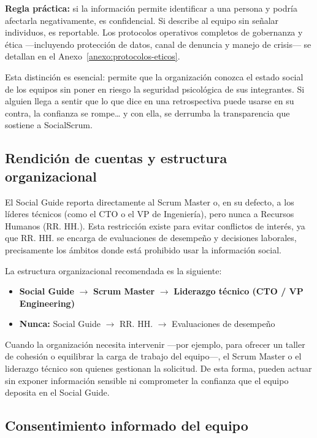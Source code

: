 \noindent\textbf{Regla práctica:} si la información permite identificar a una persona y podría afectarla negativamente, es confidencial. Si describe al equipo sin señalar individuos, es reportable. Los protocolos operativos completos de gobernanza y ética ---incluyendo protección de datos, canal de denuncia y manejo de crisis--- se detallan en el Anexo~\ref{anexo:protocolos-eticos}.

Esta distinción es esencial: permite que la organización conozca el estado social de los equipos sin poner en riesgo la seguridad psicológica de sus integrantes. Si alguien llega a sentir que lo que dice en una retrospectiva puede usarse en su contra, la confianza se rompe… y con ella, se derrumba la transparencia que sostiene a SocialScrum.

\subsection{Rendición de cuentas y estructura organizacional}

El Social Guide reporta directamente al Scrum Master o, en su defecto, a los líderes técnicos (como el CTO o el VP de Ingeniería), pero nunca a Recursos Humanos (RR. HH.). Esta restricción existe para evitar conflictos de interés, ya que RR. HH. se encarga de evaluaciones de desempeño y decisiones laborales, precisamente los ámbitos donde está prohibido usar la información social.

La estructura organizacional recomendada es la siguiente:

\begin{itemize}
    \item \textbf{Social Guide} $\rightarrow$ \textbf{Scrum Master} $\rightarrow$ \textbf{Liderazgo técnico (CTO / VP Engineering)}
    \item \textbf{Nunca:} Social Guide $\rightarrow$ RR. HH. $\rightarrow$ Evaluaciones de desempeño
\end{itemize}

Cuando la organización necesita intervenir —por ejemplo, para ofrecer un taller de cohesión o equilibrar la carga de trabajo del equipo—, el Scrum Master o el liderazgo técnico son quienes gestionan la solicitud. De esta forma, pueden actuar sin exponer información sensible ni comprometer la confianza que el equipo deposita en el Social Guide.

\subsection{Consentimiento informado del equipo}

